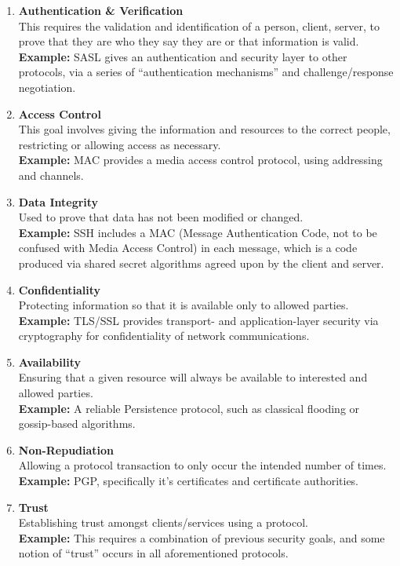 \documentclass{article}
\begin{document}
\begin{enumerate}
    \item \textbf{Authentication \& Verification} \\
    This requires the validation and identification of a person, client,
    server, to prove that they are who they say they are or that information is
    valid. \\
    \textbf{Example:} SASL gives an authentication and security layer to other
    protocols, via a series of ``authentication mechanisms'' and
    challenge/response negotiation.
    \item \textbf{Access Control} \\
    This goal involves giving the information and resources to the correct
    people, restricting or allowing access as necessary. \\
    \textbf{Example:} MAC provides a media access control protocol, using
    addressing and channels.
    \item \textbf{Data Integrity} \\
    Used to prove that data has not been modified or changed. \\
    \textbf{Example:} SSH includes a MAC (Message Authentication Code, not to
    be confused with Media Access Control) in each message, which is a code
    produced via shared secret algorithms agreed upon by the client and server.
    \item \textbf{Confidentiality} \\
    Protecting information so that it is available only to allowed parties. \\
    \textbf{Example:} TLS/SSL provides transport- and application-layer
    security via cryptography for confidentiality of network communications.
    \item \textbf{Availability} \\
    Ensuring that a given resource will always be available to interested and
    allowed parties. \\
    \textbf{Example:} A reliable Persistence protocol, such as classical
    flooding or gossip-based algorithms.
    \item \textbf{Non-Repudiation} \\
    Allowing a protocol transaction to only occur the intended number of times.
    \\ 
    \textbf{Example:} PGP, specifically it's certificates and certificate
    authorities.
    \item \textbf{Trust} \\
    Establishing trust amongst clients/services using a protocol. \\
    \textbf{Example:} This requires a combination of previous security goals,
    and some notion of ``trust'' occurs in all aforementioned protocols.
\end{enumerate}
\end{document}
